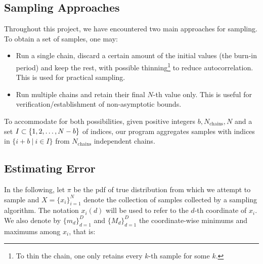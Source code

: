 



\subsection{Sampling Approaches}

Throughout this project, we have encountered two main approaches for sampling. To obtain a set of samples, one may:

\begin{itemize}
    \item Run a single chain, discard a certain amount of the initial values (the burn-in period) and keep the rest, with possible thinning\footnote{To thin the chain, one only retains every $k$-th sample for some $k$.} to reduce autocorrelation. This is used for practical sampling.
    \item Run multiple chains and retain their final $N$-th value only. This is useful for verification/establishment of non-asymptotic bounds.
\end{itemize}

To accommodate for both possibilities, given positive integers $b, N_{\text{chains}}, N$ and a set $I \subset \mathbb \{1, 2, \dots, N - b\}$ of indices, our program aggregates samples with indices in $\{i+b\ |\ i \in I\} $  from $ N_{\text{chains}}$ independent chains.

\subsection{Estimating Error}

In the following, let $\pi$ be the pdf of true distribution from which we attempt to sample and $X = \{x_i\}_{i=1}^N$ denote the collection of samples collected by a sampling algorithm. The notation $x_i(d)$ will be used to refer to the $d$-th coordinate of $x_i$. We also denote by $\{m_d\}_{d=1}^D$ and $\{M_d\}_{d=1}^D$ the coordinate-wise minimums and maximums among $x_i$, that is:

